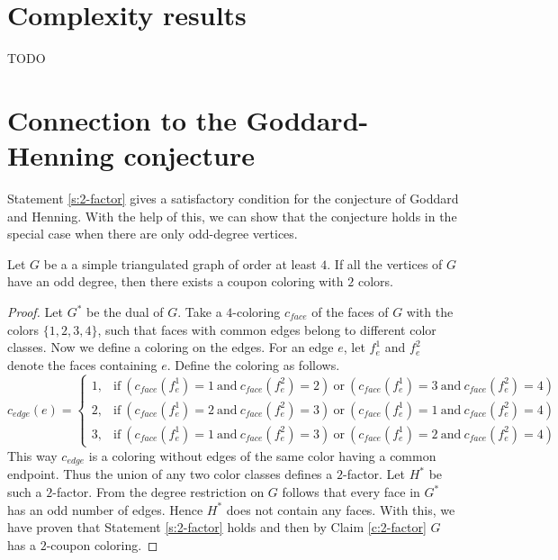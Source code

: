 \section{Complexity results}
TODO

\section{Connection to the Goddard-Henning conjecture}

Statement \ref{s:2-factor} gives a satisfactory condition for the conjecture of
Goddard and Henning. With the help of this, we can show that the conjecture holds
in the special case when there are only odd-degree vertices.

\begin{thm}\label{thm:odd}
  Let $G$ be a a simple triangulated graph of order at least $4$. If all the
  vertices of $G$ have an odd degree, then there exists a coupon coloring with $2$ colors.
\end{thm}
\begin{proof}
  Let $G^*$ be the dual of $G$. Take a $4$-coloring $c_{face}$ of the faces of
  $G$ with the colors $\{ 1, 2, 3, 4 \}$, such that faces with common edges belong to
  different color classes. Now we define a coloring on the edges. For an edge $e$,
  let $f_e^1$ and $f_e^2$ denote the faces containing $e$. Define the coloring as follows.
  \[
    c_{edge}(e) =
    \begin{cases}
      1, & \text{if}\ (c_{face}(f_e^1) = 1 \ \text{and}\ c_{face}(f_e^2) = 2) \ \text{or}\
        (c_{face}(f_e^1) = 3 \ \text{and}\ c_{face}(f_e^2) = 4)\\
      2, & \text{if}\ (c_{face}(f_e^1) = 2 \ \text{and}\ c_{face}(f_e^2) = 3) \ \text{or}\
        (c_{face}(f_e^1) = 1 \ \text{and}\ c_{face}(f_e^2) = 4)\\
      3, & \text{if}\ (c_{face}(f_e^1) = 1 \ \text{and}\ c_{face}(f_e^2) = 3) \ \text{or}\
        (c_{face}(f_e^1) = 2 \ \text{and}\ c_{face}(f_e^2) = 4)
    \end{cases}
  \]
  This way $c_{edge}$ is a coloring without edges of the same color having a common
  endpoint. Thus the union of any two color classes defines a $2$-factor. Let $H^*$
  be such a $2$-factor. From the degree restriction on $G$ follows that every face
  in $G^*$ has an odd number of edges. Hence $H^*$ does not contain any faces. With this,
  we have proven that Statement \ref{s:2-factor} holds and then by Claim \ref{c:2-factor}
  $G$ has a $2$-coupon coloring.
\end{proof}
